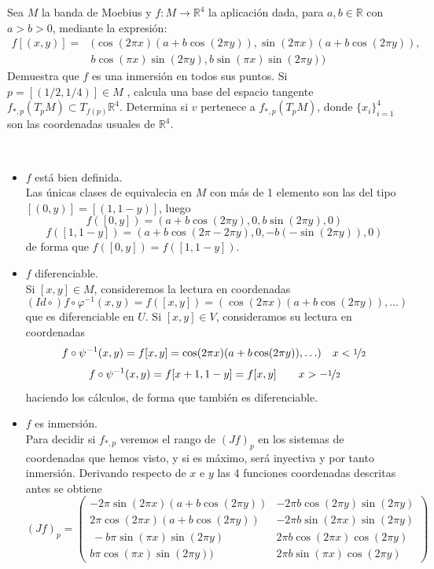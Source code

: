 \begin{ejer}
    [3.10]  Sea $M$ la banda de Moebius y $f : M \to \mathbb R^4$ la aplicaci\'on dada, para $a, b \in \mathbb R$ con $a > b > 0$, mediante la expresi\'on:
\[\begin{split} f[(x, y)] = & (\cos (2\pi x)(a + b \cos (2\pi y)),\sin (2\pi x)(a + b \cos (2\pi y)),  \\ & b \cos (\pi x)\sin (2\pi y), b\sin (\pi x)\sin (2\pi y)) \end{split}\]
Demuestra que $f$ es una inmersi\'on en todos sus puntos. Si $p = [( 1/
2 , 1/4 )] \in M$ , calcula una base del espacio tangente $f_{*,p}(T_pM)\subset T_{f(p)}\mathbb R^4$. Determina si $v$ pertenece a $f_{*,p}(T_pM)$, donde $\{x_i\}_{i=1}^4$ son las coordenadas usuales de $\mathbb R^4$.
\end{ejer}
\begin{sol}\, 
    \begin{itemize}
        \item $f$ est\'a bien definida. \\ 
        Las \'unicas clases de equivalecia en $M$ con m\'as de 1 elemento son las del tipo $[(0,y)]=[(1,1-y)]$, luego 
        $$f([0,y]) = (a+b\cos(2\pi y), 0 , b \sin(2\pi y), 0)$$ 
        $$f([1,1-y]) = (a+b\cos(2\pi-2\pi y), 0, -b (-\sin(2\pi y)), 0)$$
        de forma que $f([0,y])=f([1,1-y])$.
        \item $f$ diferenciable. \\ 
        Si $[x,y]\in M$, consideremos la lectura en coordenadas
        $$(Id \circ) f \circ \varphi^{-1}(x,y) = f([x,y]) = (\cos (2\pi x)(a + b \cos (2\pi y)),\ldots)$$ que es diferenciable en $U$. Si $[x,y] \in V$, consideramos su lectura en coordenadas
        $$f\circ \psi^{-1}(x,y) = f[x,y] = \cos (2\pi x)(a + b \cos (2\pi y)),\ldots) \quad x< \nicefrac{1}{2}$$
        $$f\circ \psi^{-1}(x,y) = f[x+1,1-y] = f[x,y]\qquad x>-\nicefrac{1}{2}$$
        haciendo los c\'alculos, de forma que tambi\'en es diferenciable. 
        \item $f$ es inmersi\'on. \\ 
        Para decidir si $f_{*,p}$ veremos el rango de $(Jf)_p$ en los sistemas de coordenadas que hemos visto, y si es m\'aximo, ser\'a inyectiva y por tanto inmersi\'on. Derivando respecto de $x$ e $y$ las 4 funciones coordenadas descritas antes se obtiene
        $$(Jf)_p = \begin{pmatrix}
            -2\pi \sin(2\pi x)(a+b\cos(2\pi y)) & -2\pi b \cos(2\pi y)\sin(2\pi y) \\ 2\pi \cos(2\pi x)(a+b\cos(2\pi y)) & -2\pi b \sin(2\pi x)\sin(2\pi y) \\\ -b\pi \sin(\pi x)\sin(2\pi y) & 2\pi b \cos(2\pi x) \cos(2\pi y)\\ b \pi  \cos(\pi x)\sin(2\pi y)) & 2\pi b\sin(\pi x) \cos(2\pi y) 

\end{pmatrix}$$
\end{itemize}
\end{sol}
